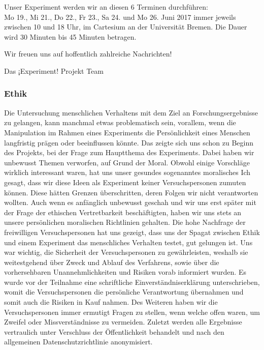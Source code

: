 \documentclass{Bericht}
\begin{document}
Unser Experiment werden wir an diesen 6 Terminen durchführen: \\

Mo 19., Mi 21., Do 22., Fr 23., Sa 24. und Mo 26. Juni 2017 immer jeweils zwischen 10 und 18 Uhr, im Cartesium an der Universität Bremen. Die Dauer wird 30 Minuten bis 45 Minuten betragen.

Wir freuen uns auf hoffentlich zahlreiche Nachrichten!

Das ¡Experiment! Projekt Team

\subsubsection {Ethik}
Die Untersuchung menschlichen Verhaltens mit dem Ziel an Forschungsergebnisse zu gelangen, kann manchmal etwas problematisch sein, vorallem, wenn die Manipulation im Rahmen eines Experiments die Persönlichkeit eines Menschen langfristig prägen oder beeinflussen könnte. Das zeigte sich uns schon zu Beginn des Projekts, bei der Frage zum Hauptthema des Experiments. Dabei haben wir unbewusst Themen verworfen, auf Grund der Moral. Obwohl einige Vorschläge wirklich interessant waren, hat uns unser gesundes sogenanntes moralisches Ich gesagt, dass wir diese Ideen als Experiment keiner Versuchspersonen zumuten können. Diese hätten Grenzen überschritten, deren Folgen wir nicht verantworten wollten. Auch wenn es anfänglich unbewusst geschah und wir uns erst später mit der Frage der ethischen Vertretbarkeit beschäftigten, haben wir uns stets an unsere persönlichen moralischen Richtlinien gehalten. Die hohe Nachfrage der freiwilligen Versuchspersonen hat uns gezeigt, dass uns der Spagat zwischen Ethik und einem Experiment  das menschliches Verhalten testet, gut gelungen ist. Uns war wichtig, die Sicherheit der Versuchspersonen zu gewährleisten, weshalb sie weitestgehend über Zweck und Ablauf des Verfahrens, sowie über die vorhersehbaren Unannehmlichkeiten und Risiken vorab informiert wurden. Es wurde vor der Teilnahme eine schriftliche Einverständniserklärung unterschrieben, womit die Versuchspersonen die persönliche Verantwortung übernahmen und somit auch die Risiken in Kauf nahmen. Des Weiteren haben wir die Versuchspersonen immer ermutigt Fragen zu stellen, wenn welche offen waren, um Zweifel oder Missverständnisse zu vermeiden. Zuletzt werden alle Ergebnisse vertraulich unter Verschluss der Öffentlichkeit behandelt und  nach den allgemeinen Datenschutzrichtlinie anonymisiert.
\end{document}
